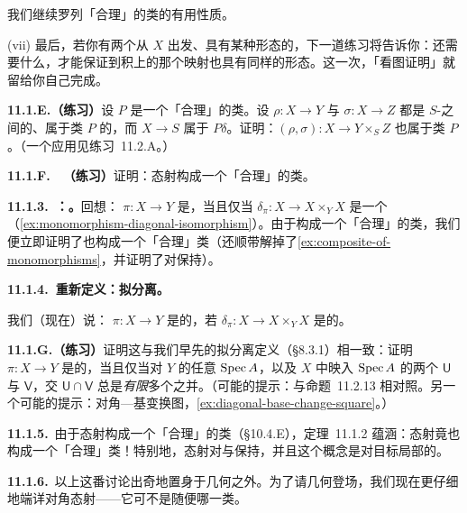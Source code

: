我们继续罗列「合理」的\trMorphism{}类的有用性质。

(vii) 最后，若你有两个从 $X$ 出发、具有某种形态的\trMorphism，下一道练习将告诉你：还需要什么，才能保证到积上的那个映射也具有同样的形态。这一次，「看图证明」就留给你自己完成。

\textbf{11.1.E.（练习）}\quad 设 $P$ 是一个「合理」的\trMorphism{}类。设 $\rho\colon X\to Y$ 与 $\sigma\colon X\to Z$ 都是 $S$-\trScheme{}之间的、属于类 $P$ 的\trMorphism，而 $X\to S$ 属于 $P\delta$。证明：$(\rho,\sigma)\colon X\to Y\times_S Z$ 也属于类 $P$。（一个应用见\mbox{练习~11.2.A}。）

\textbf{11.1.F.}\ \hard\ \textbf{（练习）}\quad 证明：\trFinitelyPresented{}态射构成一个「合理」的\trMorphism{}类。

\textbf{11.1.3.\ \trhExample{}：\trMonomorphism{}。}\quad 回想：\trMorphism{} $\pi\colon X\to Y$ 是\trMonomorphism，当且仅当\trDiagonalMorphism{} $\delta_\pi\colon X\to X\times_Y X$ 是一个\trIsomorphism（\cref{ex:monomorphism-diagonal-isomorphism}）。由于\trIsomorphism{}构成一个「合理」的\trMorphism{}类，我们便立即证明了\trMonomorphism{}也构成一个「合理」类（还顺带解掉了\cref{ex:composite-of-monomorphisms}，并证明了\trMonomorphism{}对\trBaseChange{}保持）。

\textbf{11.1.4.\ 重新定义：拟分离\trMorphism{}。}

我们（现在）说：\trMorphism{} $\pi\colon X\to Y$ 是\textbf{\trQuasiSeparated}的，若\trDiagonalMorphism{} $\delta_\pi\colon X\to X\times_Y X$ 是\trQuasicompact{}的。

\textbf{11.1.G.（练习）}\quad 证明这与我们早先的拟分离定义（\S8.3.1）相一致：证明 $\pi\colon X\to Y$ 是\trQuasiSeparated{}的，当且仅当对 $Y$ 的任意\trAffine\trOpenSet{} $\operatorname{Spec} A$，以及 $X$ 中映入 $\operatorname{Spec} A$ 的两个\trAffine\trOpenSubset{} $\mathsf{U}$ 与 $\mathsf{V}$，交 $\mathsf{U}\cap\mathsf{V}$ 总是\emph{有限}多个\trAffine\trOpenSet{}之并。（可能的提示：与命题~11.2.13 相对照。另一个可能的提示：对角—基变换图，\cref{ex:diagonal-base-change-square}。）

\textbf{11.1.5.}\ 由于\trQuasicompact{}态射构成一个「合理」的类（\S10.4.E），定理~11.1.2 蕴涵：\trQuasiSeparated{}态射竟也构成一个「合理」类！特别地，\trQuasiSeparated{}态射对\trComposition{}与\trBaseChange{}保持，并且这个概念是对目标局部的。

\textbf{11.1.6.}\ 以上这番讨论出奇地置身于几何之外。为了请几何登场，我们现在更仔细地端详对角态射——它可不是随便哪一类\trMorphism。
